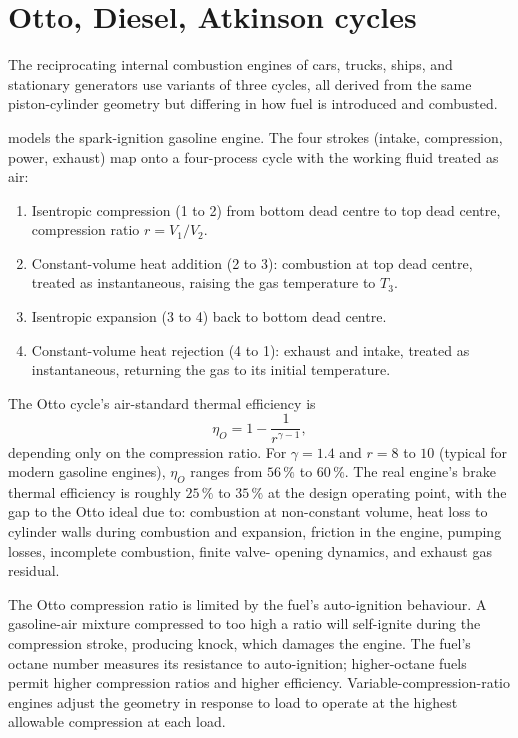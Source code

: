 \section{Otto, Diesel, Atkinson cycles}

The reciprocating internal combustion engines of cars, trucks, ships,
and stationary generators use variants of three cycles, all derived
from the same piston-cylinder geometry but differing in how fuel is
introduced and combusted.

 models the spark-ignition gasoline engine.
The four strokes (intake, compression, power, exhaust) map onto a
four-process cycle with the working fluid treated as air:

\begin{enumerate}[leftmargin=*]
  \item Isentropic compression (1 to 2) from bottom dead centre to
    top dead centre, compression ratio $r = V_1/V_2$.
  \item Constant-volume heat addition (2 to 3): combustion at top
    dead centre, treated as instantaneous, raising the gas
    temperature to $T_3$.
  \item Isentropic expansion (3 to 4) back to bottom dead centre.
  \item Constant-volume heat rejection (4 to 1): exhaust and intake,
    treated as instantaneous, returning the gas to its initial
    temperature.
\end{enumerate}



The Otto cycle's air-standard thermal efficiency is
\[
\eta_O = 1 - \frac{1}{r^{\gamma-1}},
\]
depending only on the compression ratio. For $\gamma = 1.4$ and $r =
8$ to $10$ (typical for modern gasoline engines), $\eta_O$ ranges
from $56\,\%$ to $60\,\%$. The real engine's brake thermal efficiency
is roughly $25\,\%$ to $35\,\%$ at the design operating point, with
the gap to the Otto ideal due to: combustion at non-constant volume,
heat loss to cylinder walls during combustion and expansion, friction
in the engine, pumping losses, incomplete combustion, finite valve-
opening dynamics, and exhaust gas residual.

The Otto compression ratio is limited by the fuel's auto-ignition
behaviour. A gasoline-air mixture compressed to too high a ratio will
self-ignite during the compression stroke, producing knock, which
damages the engine. The fuel's octane number measures its resistance
to auto-ignition; higher-octane fuels permit higher compression
ratios and higher efficiency. Variable-compression-ratio engines
adjust the geometry in response to load to operate at the highest
allowable compression at each load.

